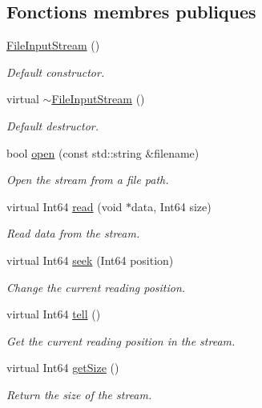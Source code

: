 \subsection*{Fonctions membres publiques}
\begin{DoxyCompactItemize}
\item 
\mbox{\label{classsf_1_1FileInputStream_a9a321e273f41ff7f187899061fcae9be}} 
\hyperlink{classsf_1_1FileInputStream_a9a321e273f41ff7f187899061fcae9be}{File\+Input\+Stream} ()
\begin{DoxyCompactList}\small\item\em Default constructor. \end{DoxyCompactList}\item 
\mbox{\label{classsf_1_1FileInputStream_ad49ae2025ff2183f80067943a7d0276d}} 
virtual \hyperlink{classsf_1_1FileInputStream_ad49ae2025ff2183f80067943a7d0276d}{$\sim$\+File\+Input\+Stream} ()
\begin{DoxyCompactList}\small\item\em Default destructor. \end{DoxyCompactList}\item 
bool \hyperlink{classsf_1_1FileInputStream_a87a95dc3a71746097a99c86ee58bb353}{open} (const std\+::string \&filename)
\begin{DoxyCompactList}\small\item\em Open the stream from a file path. \end{DoxyCompactList}\item 
virtual Int64 \hyperlink{classsf_1_1FileInputStream_ad1e94c4152429f485db224c44ee1eb50}{read} (void $\ast$data, Int64 size)
\begin{DoxyCompactList}\small\item\em Read data from the stream. \end{DoxyCompactList}\item 
virtual Int64 \hyperlink{classsf_1_1FileInputStream_abdaf5700d4e1de07568e7829106b4eb9}{seek} (Int64 position)
\begin{DoxyCompactList}\small\item\em Change the current reading position. \end{DoxyCompactList}\item 
virtual Int64 \hyperlink{classsf_1_1FileInputStream_a768c5fdb3be79e2d71d1bce911f8741c}{tell} ()
\begin{DoxyCompactList}\small\item\em Get the current reading position in the stream. \end{DoxyCompactList}\item 
virtual Int64 \hyperlink{classsf_1_1FileInputStream_aabdcaa315e088e008eeb9711ecc796e8}{get\+Size} ()
\begin{DoxyCompactList}\small\item\em Return the size of the stream. \end{DoxyCompactList}\end{DoxyCompactItemize}


